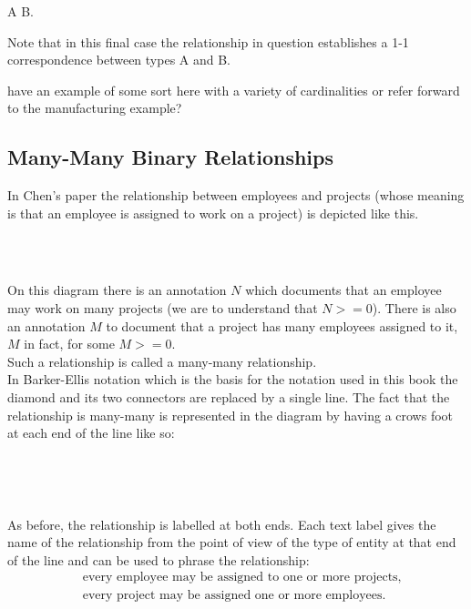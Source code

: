 A\,\barkerEllisH\,B.

Note that in this final case the relationship in question establishes a 1-1 correspondence between types A and B.

\begin{noteforfuture}
have an example of some sort here with a variety of cardinalities or refer forward to the manufacturing example?
\end{noteforfuture}


\subsection{Many-Many Binary Relationships}
In Chen's paper the relationship between employees and projects (whose meaning is that
an employee is assigned to work on a project) is depicted like this.
\begin{gather}
\label{projectWorkerChenStyle}
\raisebox{-0.9cm}{\scalebox{0.9}{

}}
\end{gather}
On this diagram there is an annotation $N$ which documents that an employee may work on many projects (we are to understand that $N >= 0$). There is also an annotation $M$ to document that
a project has many employees assigned to it, $M$ in fact, for some $M >= 0$. \\
\noindent Such a relationship is called a many-many relationship.  \\
\noindent In Barker-Ellis notation which is the basis for the notation used in this book the diamond and its two connectors are replaced by a single line. The fact that the relationship is many-many is represented in the diagram by having a crows foot at each end of the line like so:

\begin{gather}
\label{employeeProjectWorker}
\raisebox{-1cm}{

}
\end{gather}

\noindent As before, the relationship is labelled at both ends. Each text label gives the name of the relationship from the point of view of the type of entity at that end of the line and can be used to phrase the relationship:
\begin{align}
\label{assignedToText}&\mbox{every employee may be assigned to one or more projects,} \\
\label{assignedText}&\mbox{every project may be assigned one or more employees.}
\end{align}
\newpage
